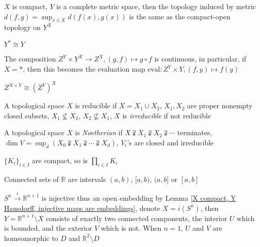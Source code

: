 \documentclass[main]{subfiles}
\begin{document}
\begin{theorem}
$X$ is compact, $Y$ is a complete metric space, then the topology induced by metric $\displaystyle d(f,g)=\sup_{x\in X}d(f(x),g(x))$ is the same as the compact-open topology on $Y^X$
\end{theorem}

\begin{theorem}
$Y^*\cong Y$
\end{theorem}

\begin{theorem}
The composition $Z^Y\times Y^X\to Z^X,(g,f)\mapsto g\circ f$ is continuous, in particular, if $X=*$, then this becomes the evaluation map $\mathrm{eval}:Z^Y\times Y,(f,y)\mapsto f(y)$
\end{theorem}

\begin{theorem}
$Z^{X\times Y}\cong \left(Z^{Y}\right)^X$
\end{theorem}

\begin{definition}
A topological space $X$ is reducible if $X=X_1\cup X_2$, $X_1,X_2$ are proper nonempty closed subsets, $X_1\nsubseteq X_2$, $X_2\nsubseteq X_1$, $X$ is \textit{irreducible} if not reducible
\end{definition}

\begin{definition}
A topological space $X$ is \textit{Noetherian} if $X\supsetneqq X_1\supsetneqq X_2\supsetneqq\cdots$ terminates, $\displaystyle\dim V=\sup_d(X_0\supsetneqq X_1\supsetneqq\cdots\supsetneqq X_d)$, $V_i$'s are closed and irreducible
\end{definition}

\begin{theorem}\label{Tychonoff's theorem}
$\{K_i\}_{i\in I}$ are compact, so is $\displaystyle\prod_{i\in I}K_i$
\end{theorem}

\begin{proposition}
Connected sets of $\mathbb R$ are intervals $(a,b)$, $[a,b)$, $(a,b]$ or $[a,b]$
\end{proposition}

\begin{theorem}\label{Jordan curve theorem}
$S^n\xrightarrow{i}\mathbb R^{n+1}$ is injective thus an open embedding by Lemma \ref{X compact, Y Hausdorff, injective maps are embeddings}, denote $X=i(S^n)$, then $Y=\mathbb R^{n+1}\setminus X$ consists of exactly two connected components, the interior $U$ which is bounded, and the exterior $V$ which is not. When $n=1$, $U$ and $V$ are homeomorphic to $D$ and $\mathbb R^2\setminus D$
\end{theorem}
\end{document}
